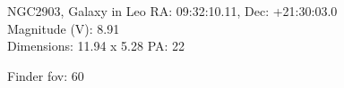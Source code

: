 \begin{block}{NGC2903, Galaxy in Leo}
    RA: 09:32:10.11, Dec: +21:30:03.0 \\ 
    Magnitude (V): 8.91 \\ 
    Dimensions: 11.94 x 5.28 PA: 22 

    Finder fov: 60 
\end{block}